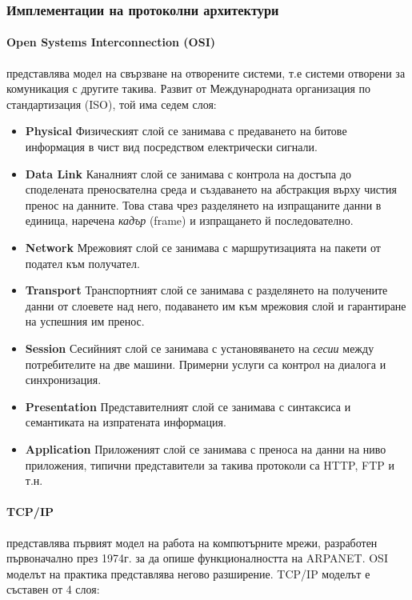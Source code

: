 \documentclass[12pt,a4paper,oneside]{book}
\begin{document}
\subsubsection{Имплементации на протоколни архитектури}

\paragraph{Open Systems Interconnection (OSI)} представлява модел на свързване
на отворените системи, т.е системи отворени за комуникация с другите такива.
Развит от Международната организация по стандартизация (ISO), той
има седем слоя:

\begin{itemize}
  \item \textbf{Physical} Физическият слой се занимава с предаването на битове
    информация в чист вид посредством електрически сигнали.
  \item \textbf{Data Link} Каналният слой се занимава с контрола на достъпа до
    споделената преносвателна среда и създаването на абстракция върху
    чистия пренос на данните. Това става чрез разделянето на
    изпращаните данни в единица, наречена \textit{кадър} (frame) и изпращането й
    последователно.
  \item \textbf{Network} Мрежовият слой се занимава с маршрутизацията на
    пакети от подател към получател.
  \item \textbf{Transport} Транспортният слой се занимава с разделянето на
    получените данни от слоевете над него, подаването им към
    мрежовия слой и гарантиране на успешния им пренос.
  \item \textbf{Session} Сесийният слой се занимава с установяването на
    \textit{сесии} между потребителите на две машини. Примерни услуги са контрол
    на диалога и синхронизация.
  \item \textbf{Presentation} Представителният слой се занимава с синтаксиса и
    семантиката на изпратената информация.
  \item \textbf{Application} Приложеният слой се занимава с преноса на данни на
    ниво приложения, типични представители за такива протоколи са HTTP, FTP и
    т.н.
\end{itemize}


\paragraph{TCP/IP} представлява първият модел на работа на
компютърните мрежи, разработен първоначално през 1974г. за да опише
функционалността на ARPANET. OSI моделът на практика представлява негово
разширение. TCP/IP моделът е съставен от 4 слоя:
\end{document}

